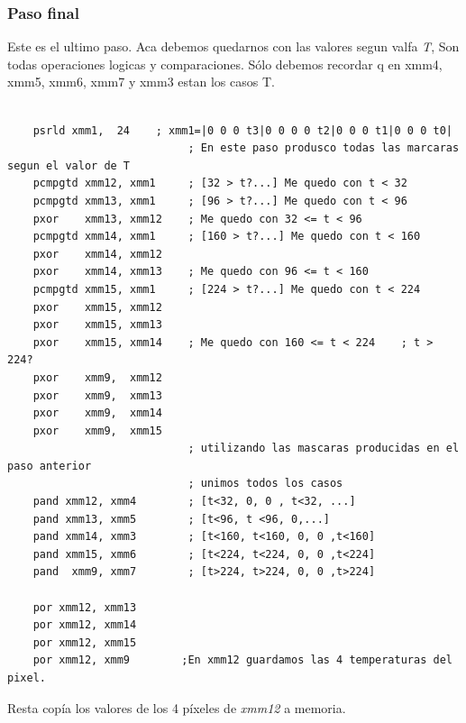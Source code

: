 \subsubsection*{Paso final}

Este es el ultimo paso. Aca debemos quedarnos con las valores segun valfa \emph{T}, Son todas operaciones logicas y comparaciones.
Sólo debemos recordar q en xmm4,  xmm5, xmm6, xmm7 y xmm3 estan los casos T.
\begin{codesnippet}
\begin{verbatim}				

    psrld xmm1,  24    ; xmm1=|0 0 0 t3|0 0 0 0 t2|0 0 0 t1|0 0 0 t0|
							; En este paso produsco todas las marcaras segun el valor de T
    pcmpgtd xmm12, xmm1     ; [32 > t?...] Me quedo con t < 32
    pcmpgtd xmm13, xmm1     ; [96 > t?...] Me quedo con t < 96
    pxor    xmm13, xmm12    ; Me quedo con 32 <= t < 96
    pcmpgtd xmm14, xmm1     ; [160 > t?...] Me quedo con t < 160
    pxor    xmm14, xmm12
    pxor    xmm14, xmm13    ; Me quedo con 96 <= t < 160
    pcmpgtd xmm15, xmm1     ; [224 > t?...] Me quedo con t < 224
    pxor    xmm15, xmm12
    pxor    xmm15, xmm13
    pxor    xmm15, xmm14    ; Me quedo con 160 <= t < 224    ; t > 224?
    pxor    xmm9,  xmm12
    pxor    xmm9,  xmm13
    pxor    xmm9,  xmm14
    pxor    xmm9,  xmm15
							; utilizando las mascaras producidas en el paso anterior 
							; unimos todos los casos
    pand xmm12, xmm4        ; [t<32, 0, 0 , t<32, ...]
    pand xmm13, xmm5        ; [t<96, t <96, 0,...]
    pand xmm14, xmm3        ; [t<160, t<160, 0, 0 ,t<160]
    pand xmm15, xmm6        ; [t<224, t<224, 0, 0 ,t<224]
    pand  xmm9, xmm7        ; [t>224, t>224, 0, 0 ,t>224]
													
    por xmm12, xmm13
    por xmm12, xmm14
    por xmm12, xmm15
    por xmm12, xmm9        ;En xmm12 guardamos las 4 temperaturas del pixel.
\end{verbatim}
\end{codesnippet}

Resta copía  los valores de los 4 píxeles de \emph{xmm12} a memoria. 
